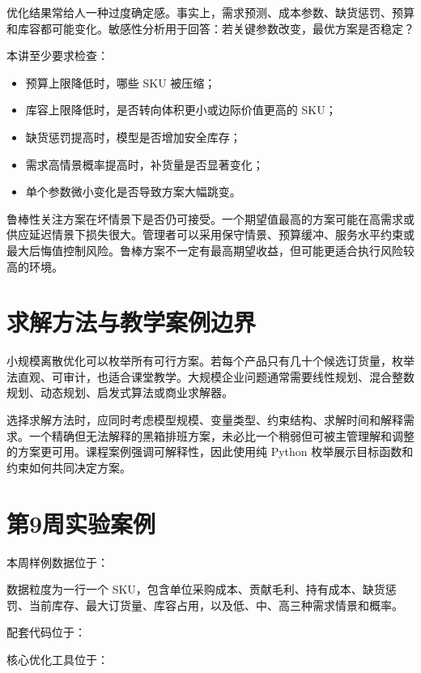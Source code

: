 \documentclass[UTF8,fontset=fandol,openany,zihao=-4]{ctexbook}
\begin{document}
优化结果常给人一种过度确定感。事实上，需求预测、成本参数、缺货惩罚、预算和库容都可能变化。敏感性分析用于回答：若关键参数改变，最优方案是否稳定？

本讲至少要求检查：
\begin{itemize}
  \item 预算上限降低时，哪些 SKU 被压缩；
  \item 库容上限降低时，是否转向体积更小或边际价值更高的 SKU；
  \item 缺货惩罚提高时，模型是否增加安全库存；
  \item 需求高情景概率提高时，补货量是否显著变化；
  \item 单个参数微小变化是否导致方案大幅跳变。
\end{itemize}

鲁棒性关注方案在坏情景下是否仍可接受。一个期望值最高的方案可能在高需求或供应延迟情景下损失很大。管理者可以采用保守情景、预算缓冲、服务水平约束或最大后悔值控制风险。鲁棒方案不一定有最高期望收益，但可能更适合执行风险较高的环境。

\section{求解方法与教学案例边界}

小规模离散优化可以枚举所有可行方案。若每个产品只有几十个候选订货量，枚举法直观、可审计，也适合课堂教学。大规模企业问题通常需要线性规划、混合整数规划、动态规划、启发式算法或商业求解器。

选择求解方法时，应同时考虑模型规模、变量类型、约束结构、求解时间和解释需求。一个精确但无法解释的黑箱排班方案，未必比一个稍弱但可被主管理解和调整的方案更可用。课程案例强调可解释性，因此使用纯 Python 枚举展示目标函数和约束如何共同决定方案。

\section{第9周实验案例}

本周样例数据位于：
\begin{center}
\end{center}
数据粒度为一行一个 SKU，包含单位采购成本、贡献毛利、持有成本、缺货惩罚、当前库存、最大订货量、库容占用，以及低、中、高三种需求情景和概率。

配套代码位于：
\begin{center}
\end{center}
核心优化工具位于：
\begin{center}
\end{center}
\end{document}
